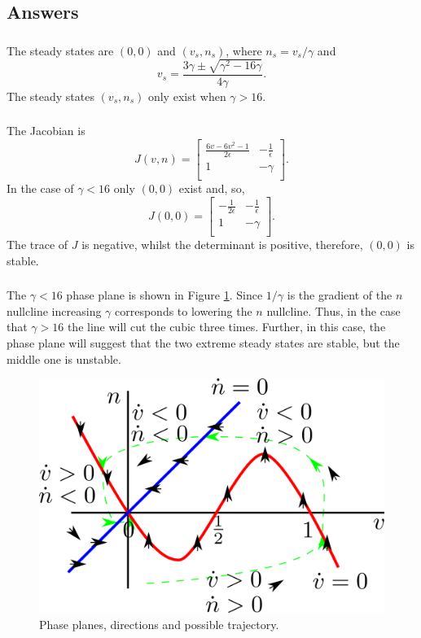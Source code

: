 \documentclass[]{article}
\newcommand{\bb}{\begin{equation}}
\newcommand{\ee}{\end{equation}}
\newcommand{\fig}[1]{Figure \ref{#1}}
\newcommand{\ttp}{.45\textwidth}
\begin{document}
\begin{Answ}
\subsection{Answers}
\subsubsection{}
The steady states are $(0,0)$ and $(v_s,n_s)$, where $n_s=v_s/\gamma$ and
\bb
v_s=\frac{3\gamma\pm\sqrt{\gamma^2-16\gamma}}{4\gamma}.
\ee
The steady states $(v_s,n_s)$ only exist when $\gamma>16$.
\subsubsection{}
The Jacobian is
\bb
J(v,n)=\left[ {\begin{array}{cc}
   \frac{6v-6v^2-1}{2\epsilon} & -\frac{1}{\epsilon} \\
   1 & -\gamma \\
  \end{array} } \right].
\ee
In the case of $\gamma<16$ only $(0,0)$ exist and, so,
\bb
J(0,0)=\left[ {\begin{array}{cc}
   -\frac{1}{2\epsilon}&-\frac{1}{\epsilon} \\
   1 & -\gamma \\
  \end{array} } \right].
\ee
The trace of $J$ is negative, whilst the determinant is positive, therefore, $(0,0)$ is stable.
\subsubsection{}
The $\gamma<16$ phase plane is shown in \fig{Fitzhugh_Nagumo}. Since $1/\gamma$ is the gradient of the $n$ nullcline increasing $\gamma$ corresponds to lowering the $n$ nullcline. Thus, in the case that $\gamma>16$ the line will cut the cubic three times. Further, in this case, the phase plane will suggest that the two extreme steady states are stable, but the middle one is unstable.
\begin{figure}[h!!!tb]
\centering
\includegraphics[width=\ttp]{../../Pictures/Fitzhugh_Nagumo.png}
\caption{Phase planes, directions and possible trajectory.\label{Fitzhugh_Nagumo}}
\end{figure}
\end{Answ}
\end{document}
